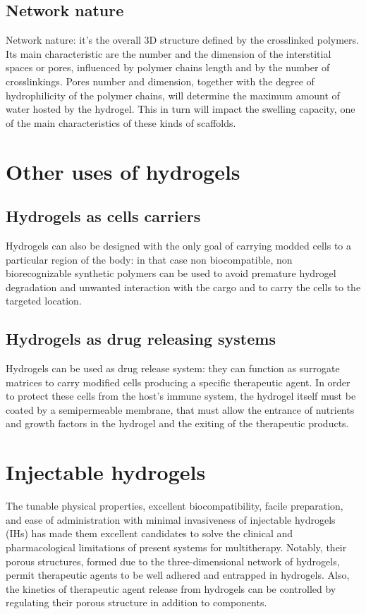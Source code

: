 	\subsection{Network nature}
	Network nature: it’s the overall 3D structure defined by the crosslinked polymers.
	Its main characteristic are the number and the dimension of the interstitial spaces or pores, influenced by polymer chains length and by the number of crosslinkings.
	Pores number and dimension, together with the degree of hydrophilicity of the polymer chains, will determine the maximum amount of water hosted by the hydrogel.
	This in turn will impact the swelling capacity, one of the main characteristics of these kinds of scaffolds.

\section{Other uses of hydrogels}

	\subsection{Hydrogels as cells carriers}
	Hydrogels can also be designed with the only goal of carrying modded cells to a particular region of the body: in that case non biocompatible, non biorecognizable synthetic polymers can be used to avoid premature hydrogel degradation and unwanted interaction with the cargo and to carry the cells to the targeted location.

	\subsection{Hydrogels as drug releasing systems}
	Hydrogels can be used as drug release system: they can function as surrogate matrices to carry modified cells producing a specific therapeutic agent.
	In order to protect these cells from the host’s immune system, the hydrogel itself must be coated by a semipermeable membrane, that must allow the entrance of nutrients and growth factors in the hydrogel and the exiting of the therapeutic products.
	
\section{Injectable hydrogels}
The tunable physical properties, excellent biocompatibility, facile preparation, and ease of administration with minimal invasiveness of injectable hydrogels (IHs) has made them excellent candidates to solve the clinical and pharmacological limitations of present systems for multitherapy. 
Notably, their porous structures, formed due to the three-dimensional network of hydrogels, permit therapeutic agents to be well adhered and entrapped in hydrogels. Also, the kinetics of therapeutic agent release from hydrogels can be controlled by regulating their porous structure in addition to components.
